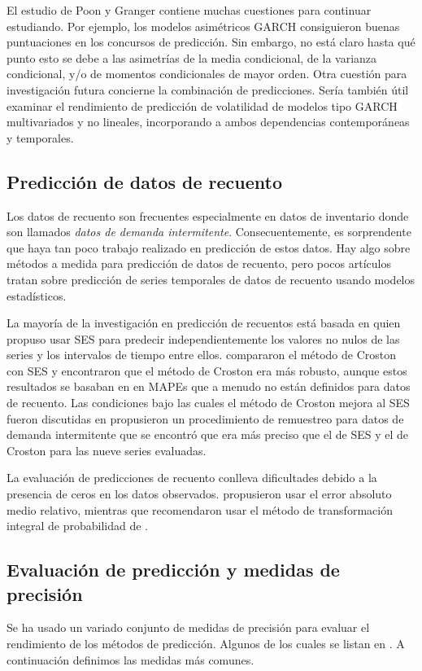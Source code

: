 \documentclass{llncs}
\begin{document}
El estudio de Poon y Granger contiene muchas cuestiones para continuar estudiando. Por ejemplo, los modelos asimétricos GARCH consiguieron buenas puntuaciones en los concursos de predicción. Sin embargo, no está claro hasta qué punto esto se debe a las asimetrías de la media condicional, de la varianza condicional, y/o de momentos condicionales de mayor orden. Otra cuestión para investigación futura concierne la combinación de predicciones. Sería también útil examinar el rendimiento de predicción de volatilidad de modelos tipo GARCH multivariados y no lineales, incorporando a ambos dependencias contemporáneas y temporales.

\subsection{Predicción de datos de recuento}
Los datos de recuento son frecuentes especialmente en datos de inventario donde son llamados \emph{datos de demanda intermitente}. Consecuentemente, es sorprendente que haya tan poco trabajo realizado en predicción de estos datos. Hay algo sobre métodos a medida para predicción de datos de recuento, pero pocos artículos tratan sobre predicción de series temporales de datos de recuento usando modelos estadísticos.

La mayoría de la investigación en predicción de recuentos está basada en \cite{Croston1972289} quien propuso usar SES para predecir independientemente los valores no nulos de las series y los intervalos de tiempo entre ellos. \cite{Willemain1994529} compararon el método de Croston con SES y encontraron que el método de Croston era más robusto, aunque estos resultados se basaban en en MAPEs que a menudo no están definidos para datos de recuento. Las condiciones bajo las cuales el método de Croston mejora al SES fueron discutidas en \cite{Johnston1996297} \cite{Willemain2004375} propusieron un procedimiento de remuestreo para datos de demanda intermitente que se encontró que era más preciso que el de SES y el de Croston para las nueve series evaluadas.

La evaluación de predicciones de recuento conlleva dificultades debido a la presencia de ceros en los datos observados. \cite{Syntetos2005303} propusieron usar el error absoluto medio relativo, mientras que \cite{Willemain2004375} recomendaron usar el método de transformación integral de probabilidad de \cite{Diebold1998863}.


\subsection{Evaluación de predicción y medidas de precisión}
Se ha usado un variado conjunto de medidas de precisión para evaluar el rendimiento de los métodos de predicción. Algunos de los cuales se listan en \cite{Mahmoud1984139}. A continuación definimos las medidas más comunes. 
\end{document}
